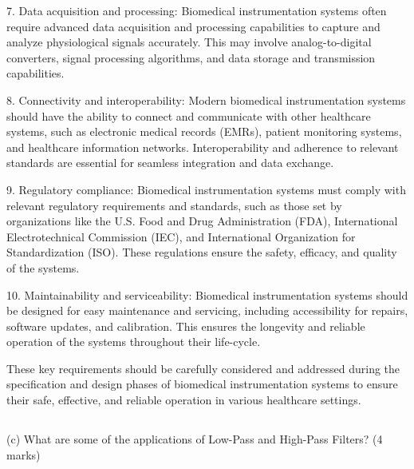 \documentclass[article]{article}
\begin{document}
{7. Data acquisition and processing: Biomedical instrumentation systems often require advanced data acquisition and processing capabilities to capture and analyze physiological signals accurately. This may involve analog-to-digital converters, signal processing algorithms, and data storage and transmission capabilities.

8. Connectivity and interoperability: Modern biomedical instrumentation systems should have the ability to connect and communicate with other healthcare systems, such as electronic medical records (EMRs), patient monitoring systems, and healthcare information networks. Interoperability and adherence to relevant standards are essential for seamless integration and data exchange.

9. Regulatory compliance: Biomedical instrumentation systems must comply with relevant regulatory requirements and standards, such as those set by organizations like the U.S. Food and Drug Administration (FDA), International Electrotechnical Commission (IEC), and International Organization for Standardization (ISO). These regulations ensure the safety, efficacy, and quality of the systems.

10. Maintainability and serviceability: Biomedical instrumentation systems should be designed for easy maintenance and servicing, including accessibility for repairs, software updates, and calibration. This ensures the longevity and reliable operation of the systems throughout their life-cycle.

These key requirements should be carefully considered and addressed during the specification and design phases of biomedical instrumentation systems to ensure their safe, effective, and reliable operation in various healthcare settings.}
\subsection*{}(c) What are some of the applications of Low-Pass and High-Pass Filters?
(4 marks)
\end{document}

